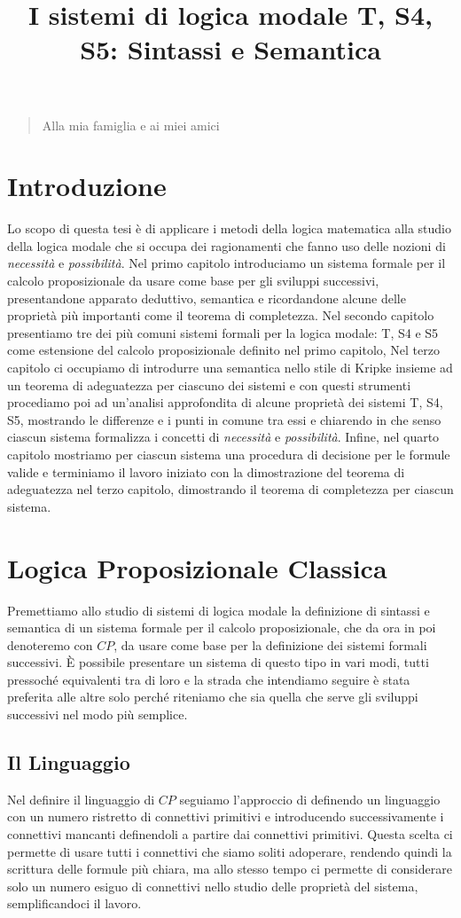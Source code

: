 \documentclass[a4paper, titlepage, 12pt]{report}
\title{I sistemi di logica modale T, S4, S5: Sintassi e Semantica}
\date{}
\newenvironment{dedication}
         {\vspace{6ex}\begin{quotation}\begin{center}\begin{em}}
         {\par\end{em}\end{center}\end{quotation}}
\begin{document}
\begin{dedication}
Alla mia famiglia e ai miei amici
\end{dedication}
\tableofcontents
\chapter*{Introduzione}
Lo scopo di questa tesi è di applicare i metodi della logica matematica
alla studio della logica modale che si occupa dei
ragionamenti che fanno uso delle nozioni
di \emph{necessità} e \emph{possibilità}.
Nel primo capitolo introduciamo un sistema formale per il calcolo
proposizionale da usare come base per gli sviluppi successivi,
presentandone apparato deduttivo, semantica e ricordandone
alcune delle proprietà più importanti come il teorema di completezza.
Nel secondo capitolo presentiamo tre dei più comuni sistemi formali
per la logica modale: T, S4 e S5 come estensione del calcolo proposizionale
definito nel primo capitolo,
Nel terzo capitolo ci occupiamo di introdurre una semantica nello stile
di Kripke insieme ad un teorema di adeguatezza per ciascuno dei sistemi e
con questi strumenti procediamo poi ad un'analisi approfondita di alcune proprietà
dei sistemi T, S4, S5, mostrando le differenze e i punti in comune tra essi
e chiarendo in che senso ciascun sistema formalizza i concetti di
\emph{necessità} e \emph{possibilità}.
Infine, nel quarto capitolo mostriamo per ciascun sistema una procedura di decisione
per le formule valide e terminiamo il lavoro iniziato con la dimostrazione
del teorema di adeguatezza nel terzo capitolo, dimostrando il teorema
di completezza per ciascun sistema.

\chapter{Logica Proposizionale Classica}
Premettiamo allo studio di sistemi di logica modale la definizione
di sintassi e semantica di un sistema formale per il calcolo proposizionale,
che da ora in poi denoteremo con $CP$, da usare come base per la definizione
dei sistemi formali successivi.
È possibile presentare un sistema di questo tipo in vari modi, tutti pressoché equivalenti tra di loro
e la strada che intendiamo seguire è stata preferita alle altre solo
perché riteniamo che sia quella che serve gli sviluppi successivi nel modo più semplice.

\section{Il Linguaggio}
Nel definire il linguaggio di $CP$ seguiamo l'approccio di \cite{IntroModale}
definendo un linguaggio con un numero ristretto
di connettivi primitivi e introducendo successivamente i connettivi mancanti definendoli a partire
dai connettivi primitivi.
Questa scelta ci permette di usare tutti i connettivi che siamo soliti adoperare,
rendendo quindi la scrittura delle formule più chiara, ma allo stesso tempo ci permette di
considerare solo un numero esiguo di connettivi nello studio delle proprietà del sistema,
semplificandoci il lavoro.
\end{document}

